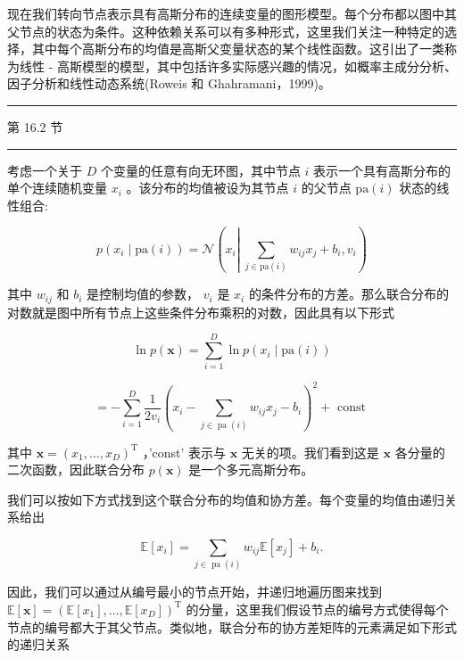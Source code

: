 \documentclass[10pt]{report}
\newcommand{\HRule}{\begin{center}\rule{0.9\linewidth}{0.2mm}\end{center}}
\begin{document}
现在我们转向节点表示具有高斯分布的连续变量的图形模型。每个分布都以图中其父节点的状态为条件。这种依赖关系可以有多种形式，这里我们关注一种特定的选择，其中每个高斯分布的均值是高斯父变量状态的某个线性函数。这引出了一类称为线性 - 高斯模型的模型，其中包括许多实际感兴趣的情况，如概率主成分分析、因子分析和线性动态系统(Roweis 和 Ghahramani，1999)。

\HRule

第 16.2 节

\HRule

考虑一个关于 \(D\) 个变量的任意有向无环图，其中节点 \(i\) 表示一个具有高斯分布的单个连续随机变量 \({x}_{i}\) 。该分布的均值被设为其节点 \(i\) 的父节点 \(\mathrm{{pa}}\left( i\right)\) 状态的线性组合:

\[
p\left( {{x}_{i} \mid  \mathrm{{pa}}\left( i\right) }\right)  = \mathcal{N}\left( {{x}_{i}\left| {\;\mathop{\sum }\limits_{{j \in  \mathrm{{pa}}\left( i\right) }}{w}_{ij}{x}_{j} + {b}_{i},{v}_{i}}\right. }\right)  \tag{11.9}
\]

其中 \({w}_{ij}\) 和 \({b}_{i}\) 是控制均值的参数， \({v}_{i}\) 是 \({x}_{i}\) 的条件分布的方差。那么联合分布的对数就是图中所有节点上这些条件分布乘积的对数，因此具有以下形式

\[
\ln p\left( \mathbf{x}\right)  = \mathop{\sum }\limits_{{i = 1}}^{D}\ln p\left( {{x}_{i} \mid  \mathrm{{pa}}\left( i\right) }\right)  \tag{11.10}
\]

\[
=  - \mathop{\sum }\limits_{{i = 1}}^{D}\frac{1}{2{v}_{i}}{\left( {x}_{i} - \mathop{\sum }\limits_{{j \in  \operatorname{pa}\left( i\right) }}{w}_{ij}{x}_{j} - {b}_{i}\right) }^{2} + \text{ const } \tag{11.11}
\]

其中 \(\mathbf{x} = {\left( {x}_{1},\ldots ,{x}_{D}\right) }^{\mathrm{T}}\) ，’const’ 表示与 \(\mathbf{x}\) 无关的项。我们看到这是 \(\mathbf{x}\) 各分量的二次函数，因此联合分布 \(p\left( \mathbf{x}\right)\) 是一个多元高斯分布。

我们可以按如下方式找到这个联合分布的均值和协方差。每个变量的均值由递归关系给出

\[
\mathbb{E}\left\lbrack  {x}_{i}\right\rbrack   = \mathop{\sum }\limits_{{j \in  \operatorname{pa}\left( i\right) }}{w}_{ij}\mathbb{E}\left\lbrack  {x}_{j}\right\rbrack   + {b}_{i}. \tag{11.12}
\]

因此，我们可以通过从编号最小的节点开始，并递归地遍历图来找到 \(\mathbb{E}\left\lbrack  \mathbf{x}\right\rbrack   = {\left( \mathbb{E}\left\lbrack  {x}_{1}\right\rbrack  ,\ldots ,\mathbb{E}\left\lbrack  {x}_{D}\right\rbrack  \right) }^{\mathrm{T}}\) 的分量，这里我们假设节点的编号方式使得每个节点的编号都大于其父节点。类似地，联合分布的协方差矩阵的元素满足如下形式的递归关系
\end{document}
